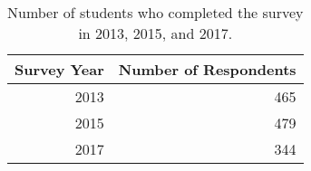 \documentclass[11pt]{article}
\begin{document}
\begin{table}[h]
\centering
\caption{Number of students who completed the survey in 2013, 2015, and 2017.} 
\begin{tabular}{rr}
  \hline
Survey Year & Number of Respondents \\ 
  \hline
2013 & 465 \\ 
  2015 & 479 \\ 
  2017 & 344 \\ 
   \hline
\end{tabular}
\end{table}
\captionsetup{width=\textwidth, singlelinecheck=false, justification= raggedright}
\end{document}
